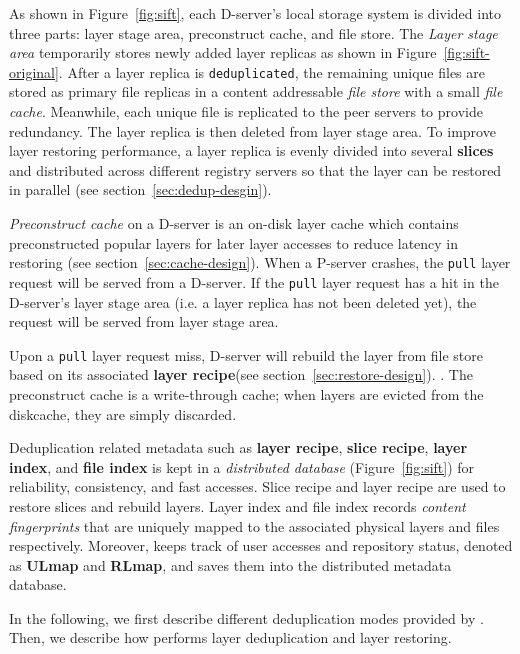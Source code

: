 As shown in Figure~\ref{fig:sift}, 
each D-server's local storage system is
divided into three parts: layer stage area, preconstruct cache, and file store. The \emph{Layer stage area} temporarily stores newly added layer replicas as shown in Figure~\ref{fig:sift-original}.
After a layer replica is \texttt{deduplicated}, 
the remaining unique files are stored as primary file replicas in a content 
addressable \emph{file store} with a small \emph{file cache}. 
Meanwhile, each unique file is replicated to the peer servers to provide redundancy.
The layer replica is then deleted from layer stage area.
To improve layer restoring performance, 
a layer replica is evenly divided into several \textbf{slices} and distributed across different registry servers so that
the layer can be restored in parallel (see section~\ref{sec:dedup-desgin}).
  
\emph{Preconstruct cache} on a D-server is an on-disk layer cache which contains preconstructed popular layers for later layer accesses to reduce latency in restoring (see section~\ref{sec:cache-design}).
When a P-server crashes,
the \texttt{pull} layer request will be served from a D-server.
If the \texttt{pull} layer request has a hit in the D-server's layer stage area (i.e. a layer replica has not been deleted yet),
the request will be served from layer stage area.

Upon a \texttt{pull} layer request miss, D-server will rebuild the layer from file store
based on its associated \textbf{layer recipe}(see section~\ref{sec:restore-design}). 
.
The preconstruct cache is a write-through cache; when layers are evicted from the diskcache, they are simply discarded.

Deduplication related metadata such as \textbf{layer recipe}, \textbf{slice recipe}, \textbf{layer index}, and \textbf{file index} is kept in a \emph{distributed database} (Figure~\ref{fig:sift}) for 
reliability, consistency, and fast accesses. 
Slice recipe and layer recipe are used to restore slices and rebuild layers.
Layer index and file index records \emph{content fingerprints} that are uniquely mapped to the associated physical layers and files respectively. %
Moreover, \sysname keeps track of user accesses and repository status, 
denoted as \textbf{ULmap} and \textbf{RLmap}, 
and saves them into the distributed metadata database.

In the following, we first describe different deduplication modes provided by \sysname.
Then, we describe how \sysname performs layer deduplication and layer restoring.

